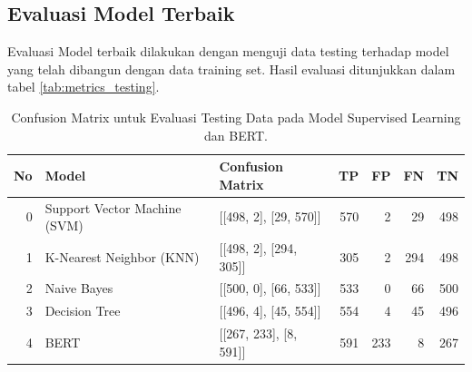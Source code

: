 \documentclass{article}\usepackage{float}
\begin{document}
\subsection{Evaluasi Model Terbaik}
Evaluasi Model terbaik dilakukan dengan menguji data testing terhadap model yang telah dibangun dengan data training set. Hasil evaluasi ditunjukkan dalam tabel \ref{tab:metrics_testing}.
\begin{table}[ht!]
\centering
\begin{tabular}{r|l|l|r|r|r|r}
\toprule
No & Model                        & Confusion Matrix       & TP   & FP   & FN   & TN   \\ \midrule
0  & Support Vector Machine (SVM) & [[498, 2], [29, 570]]  & 570  & 2    & 29   & 498  \\
1  & K-Nearest Neighbor (KNN)     & [[498, 2], [294, 305]] & 305  & 2    & 294  & 498  \\
2  & Naive Bayes                  & [[500, 0], [66, 533]]  & 533  & 0    & 66   & 500  \\
3  & Decision Tree                & [[496, 4], [45, 554]]  & 554  & 4    & 45   & 496  \\
4  & BERT                         & [[267, 233], [8, 591]] & 591  & 233  & 8    & 267  \\ \bottomrule
\end{tabular}
\caption{\label{tab:confusion_matrix_testing} Confusion Matrix untuk Evaluasi Testing Data pada Model Supervised Learning dan BERT.}
\end{table}
\end{document}
